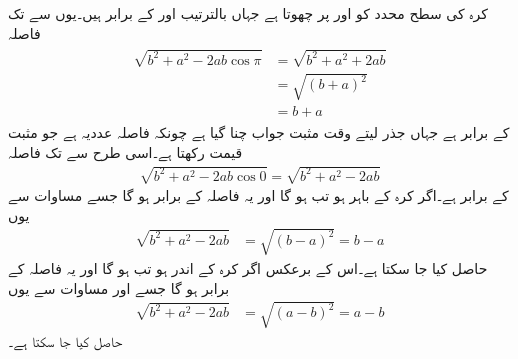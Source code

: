 کرہ کی سطح  محدد کو  اور   پر چھوتا ہے جہاں  بالترتیب  اور  کے برابر ہیں۔یوں  سے  تک فاصلہ
\begin{gather}
\begin{aligned}\label{مساوات_کولمب_کرہ_مثبت_محدد}
\sqrt{b^2+a^2-2 ab \cos \pi}&=\sqrt{b^2+a^2+2 ab}\\
&=\sqrt{(b+a)^2}\\
&=b+a
\end{aligned}
\end{gather}
کے برابر ہے جہاں جذر لیتے وقت مثبت جواب چنا گیا ہے چونکہ فاصلہ عددیہ ہے جو مثبت قیمت رکھتا ہے۔اسی طرح  سے  تک فاصلہ
\begin{align}\label{مساوات_کولمب_کرہ_مثبت_محدد_الف}
\sqrt{b^2+a^2-2 ab \cos 0}=\sqrt{b^2+a^2-2 ab}
\end{align}
کے برابر ہے۔اگر  کرہ کے باہر ہو تب  ہو گا اور یہ فاصلہ  کے برابر ہو گا جسے  مساوات  سے یوں
\begin{align}\label{مساوات_کولمب_کرہ_مثبت_محدد_ب}
\sqrt{b^2+a^2-2 ab}&=\sqrt{(b-a)^2}=b-a
\end{align}
حاصل کیا جا سکتا ہے۔اس کے برعکس اگر  کرہ کے اندر ہو تب  ہو گا اور یہ فاصلہ  کے برابر ہو گا جسے  اور مساوات  سے یوں
\begin{align}\label{مساوات_کولمب_کرہ_مثبت_محدد_پ}
\sqrt{b^2+a^2-2 ab}&=\sqrt{(a-b)^2}=a-b
\end{align}
حاصل کیا جا سکتا ہے۔

